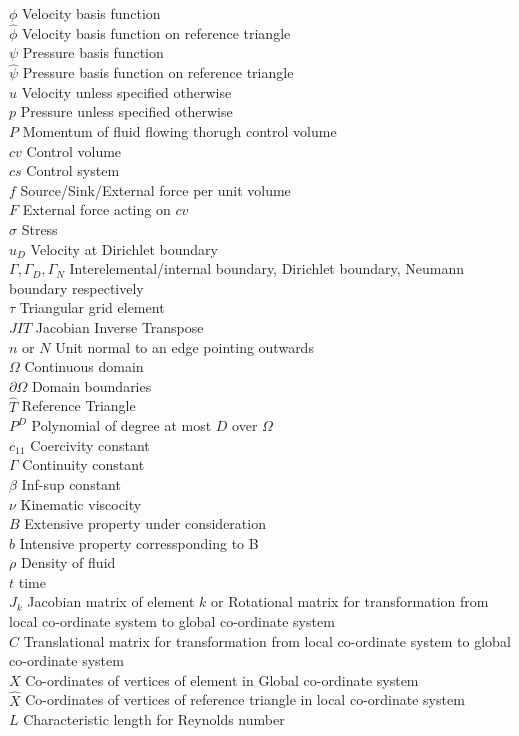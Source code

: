 \documentclass[a4paper,10pt]{book}
\begin{document}
$\phi$ Velocity basis function\\
$\hat{\phi}$ Velocity basis function on reference triangle\\
$\psi$ Pressure basis function\\
$\hat{\psi}$ Pressure basis function on reference triangle\\
$u$ Velocity unless specified otherwise\\
$p$ Pressure unless specified otherwise\\
$P$ Momentum of fluid flowing thorugh control volume\\
$cv$ Control volume\\
$cs$ Control system\\
$f$ Source/Sink/External force per unit volume\\
$F$ External force acting on $cv$\\
$\sigma$ Stress\\
$u_D$ Velocity at Dirichlet boundary\\
$\Gamma, \Gamma_D, \Gamma_N$ Interelemental/internal boundary, Dirichlet boundary, Neumann boundary respectively\\
$\tau$ Triangular grid element\\
$JIT$ Jacobian Inverse Transpose\\
$n$ or $N$ Unit normal to an edge pointing outwards\\
$\Omega$ Continuous domain\\
$\partial \Omega$ Domain boundaries\\
$\hat{T}$ Reference Triangle\\
$P^D$ Polynomial of degree at most $D$ over $\Omega$\\
$c_{11}$ Coercivity constant\\
$\Gamma$ Continuity constant\\
$\beta$ Inf-sup constant\\
$\nu$ Kinematic viscocity\\
$B$ Extensive property under consideration  \\
$b$ Intensive property corressponding to B \\
$\rho$ Density of fluid \\
$t$ time\\
$J_k$ Jacobian matrix of element $k$ or Rotational matrix for transformation from local co-ordinate system to global co-ordinate system\\
$C$ Translational matrix for transformation from local co-ordinate system to global co-ordinate system\\
$X$ Co-ordinates of vertices of element in Global co-ordinate system\\
$\hat{X}$ Co-ordinates of vertices of reference triangle in local co-ordinate system\\
$L$ Characteristic length for Reynolds number\\
\end{document}
